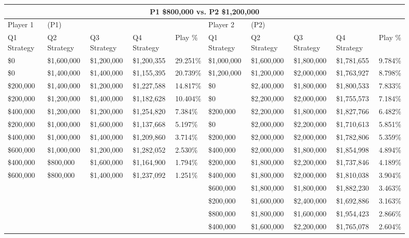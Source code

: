 \documentclass[11pt]{article}
\begin{document}
\begin{figure}
\tiny
\begin{tabular}{ |p{1.0cm}p{1.0cm}p{1.0cm}p{2.0cm}|p{1.0cm}||p{1.0cm}p{1.0cm}p{1.0cm}p{2.0cm}|p{1.0cm}|}
\hline
\multicolumn{10}{|c|}{P1 \$800,000 vs. P2 \$1,200,000} \\
\hline
Player 1 & (P1) & & & & Player 2 & (P2) & & & \\
\hline
Q1 Strategy & Q2 Strategy & Q3 Strategy & Q4 Strategy  &  Play \% & Q1 Strategy & Q2 Strategy & Q3 Strategy & Q4 Strategy  &  Play \%\\
\hline
\$0 & \$1,600,000 & \$1,200,000 & \$1,200,355 & 29.251\% & \$1,000,000 & \$1,600,000 & \$1,800,000 & \$1,781,655 & 9.784\% \\
\$0 & \$1,400,000 & \$1,400,000 & \$1,155,395 & 20.739\% & \$1,200,000 & \$1,200,000 & \$2,000,000 & \$1,763,927 & 8.798\% \\
\$200,000 & \$1,400,000 & \$1,200,000 & \$1,227,588 & 14.817\% & \$0 & \$2,400,000 & \$1,800,000 & \$1,800,533 & 7.833\% \\
\$200,000 & \$1,200,000 & \$1,400,000 & \$1,182,628 & 10.404\% & \$0 & \$2,200,000 & \$2,000,000 & \$1,755,573 & 7.184\% \\
\$400,000 & \$1,200,000 & \$1,200,000 & \$1,254,820 & 7.384\% & \$200,000 & \$2,200,000 & \$1,800,000 & \$1,827,766 & 6.482\% \\
\$200,000 & \$1,000,000 & \$1,600,000 & \$1,137,668 & 5.197\% & \$0 & \$2,000,000 & \$2,200,000 & \$1,710,613 & 5.851\% \\
\$400,000 & \$1,000,000 & \$1,400,000 & \$1,209,860 & 3.714\% & \$200,000 & \$2,000,000 & \$2,000,000 & \$1,782,806 & 5.359\% \\
\$600,000 & \$1,000,000 & \$1,200,000 & \$1,282,052 & 2.530\% & \$400,000 & \$2,000,000 & \$1,800,000 & \$1,854,998 & 4.894\% \\
\$400,000 & \$800,000 & \$1,600,000 & \$1,164,900 & 1.794\% & \$200,000 & \$1,800,000 & \$2,200,000 & \$1,737,846 & 4.189\% \\
\$600,000 & \$800,000 & \$1,400,000 & \$1,237,092 & 1.251\% & \$400,000 & \$1,800,000 & \$2,000,000 & \$1,810,038 & 3.904\% \\
&&&& & \$600,000 & \$1,800,000 & \$1,800,000 & \$1,882,230 & 3.463\% \\
&&&& & \$200,000 & \$1,600,000 & \$2,400,000 & \$1,692,886 & 3.163\% \\
&&&& & \$800,000 & \$1,800,000 & \$1,600,000 & \$1,954,423 & 2.866\% \\
&&&& & \$400,000 & \$1,600,000 & \$2,200,000 & \$1,765,078 & 2.604\% \\

\end{tabular}
\end{figure}
\end{document}
